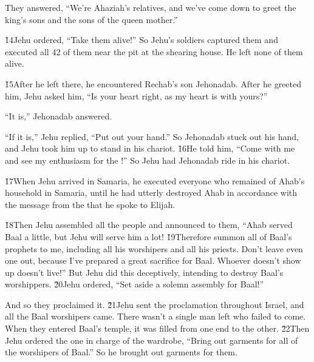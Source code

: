 They answered, ``We're Ahaziah's relatives, and we've come down to greet the king's sons and the sons of the queen mother.''

\v{14}Jehu ordered, ``Take them alive!'' So Jehu's soldiers captured them and executed all 42 of them near the pit at the shearing house. He left none of them alive.

\v{15}After he left there, he encountered Rechab's son Jehonadab. After he greeted him, Jehu asked him, ``Is your heart right, as my heart is with yours?''

``It is,'' Jehonadab answered.

``If it is,'' Jehu replied, ``Put out your hand.'' So Jehonadab stuck out his hand, and Jehu took him up to stand in his chariot. \v{16}He told him, ``Come with me and see my enthusiasm for the !'' So Jehu had Jehonadab ride in his chariot.

\v{17}When Jehu arrived in Samaria, he executed everyone who remained of Ahab's household in Samaria, until he had utterly destroyed Ahab in accordance with the message from the  that he spoke to Elijah.

\v{18}Then Jehu assembled all the people and announced to them, ``Ahab served Baal a little, but Jehu will serve him a lot! \v{19}Therefore summon all of Baal's prophets to me, including all his worshipers and all his priests. Don't leave even one out, because I've prepared a great sacrifice for Baal. Whoever doesn't show up doesn't live!'' But Jehu did this deceptively, intending to destroy Baal's worshippers. \v{20}Jehu ordered, ``Set aside a solemn assembly for Baal!''

And so they proclaimed it. \v{21}Jehu sent the proclamation throughout Israel, and all the Baal worshipers came. There wasn't a single man left who failed to come. When they entered Baal's temple, it was filled from one end to the other. \v{22}Then Jehu ordered the one in charge of the wardrobe, ``Bring out garments for all of the worshipers of Baal.'' So he brought out garments for them.

